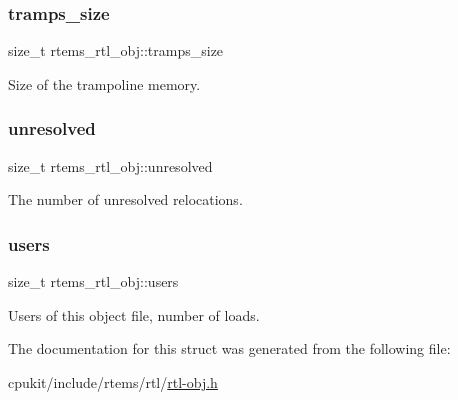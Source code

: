 \subsubsection{\texorpdfstring{tramps\_size}{tramps\_size}}
{\footnotesize\ttfamily size\+\_\+t rtems\+\_\+rtl\+\_\+obj\+::tramps\+\_\+size}

Size of the trampoline memory. \mbox{\label{structrtems__rtl__obj_a75894c4336871dcff6dac06fffd37330}} 
\subsubsection{\texorpdfstring{unresolved}{unresolved}}
{\footnotesize\ttfamily size\+\_\+t rtems\+\_\+rtl\+\_\+obj\+::unresolved}

The number of unresolved relocations. \mbox{\label{structrtems__rtl__obj_a646ffe9df749ea146afb626057d3ac96}} 
\subsubsection{\texorpdfstring{users}{users}}
{\footnotesize\ttfamily size\+\_\+t rtems\+\_\+rtl\+\_\+obj\+::users}

Users of this object file, number of loads. 

The documentation for this struct was generated from the following file\+:\begin{DoxyCompactItemize}
\item 
cpukit/include/rtems/rtl/\mbox{\hyperlink{rtl-obj_8h}{rtl-\/obj.\+h}}\end{DoxyCompactItemize}
